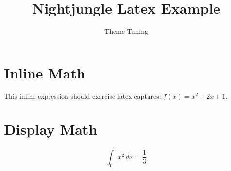 \documentclass{article}
\title{Nightjungle Latex Example}
\author{Theme Tuning}
\begin{document}
\maketitle

\section{Inline Math}

This inline expression should exercise latex captures: $f(x) = x^2 + 2x + 1$.

\section{Display Math}

\[
  \int_0^1 x^2\,dx = \frac{1}{3}
\]
\end{document}
